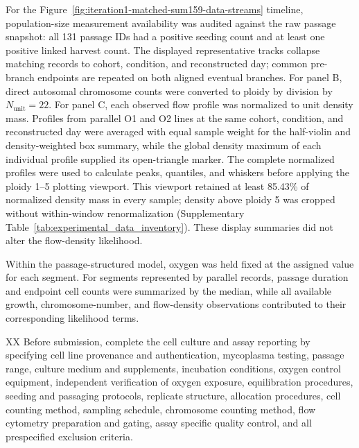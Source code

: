 \documentclass[11pt]{article}
\begin{document}
For the Figure~\ref{fig:iteration1-matched-sum159-data-streams} timeline, population-size measurement availability was audited against the raw passage snapshot: all 131 passage IDs had a positive seeding count and at least one positive linked harvest count. The displayed representative tracks collapse matching records to cohort, condition, and reconstructed day; common pre-branch endpoints are repeated on both aligned eventual branches. For panel B, direct autosomal chromosome counts were converted to ploidy by division by $N_{\mathrm{unit}}=22$. For panel C, each observed flow profile was normalized to unit density mass. Profiles from parallel O1 and O2 lines at the same cohort, condition, and reconstructed day were averaged with equal sample weight for the half-violin and density-weighted box summary, while the global density maximum of each individual profile supplied its open-triangle marker. The complete normalized profiles were used to calculate peaks, quantiles, and whiskers before applying the ploidy 1--5 plotting viewport. This viewport retained at least 85.43\% of normalized density mass in every sample; density above ploidy 5 was cropped without within-window renormalization (Supplementary Table~\ref{tab:experimental_data_inventory}). These display summaries did not alter the flow-density likelihood.

Within the passage-structured model, oxygen was held fixed at the assigned value for each segment. For segments represented by parallel records, passage duration and endpoint cell counts were summarized by the median, while all available growth, chromosome-number, and flow-density observations contributed to their corresponding likelihood terms.

XX Before submission, complete the cell culture and assay reporting by specifying cell line provenance and authentication, mycoplasma testing, passage range, culture medium and supplements, incubation conditions, oxygen control equipment, independent verification of oxygen exposure, equilibration procedures, seeding and passaging protocols, replicate structure, allocation procedures, cell counting method, sampling schedule, chromosome counting method, flow cytometry preparation and gating, assay specific quality control, and all prespecified exclusion criteria.






\end{document}
